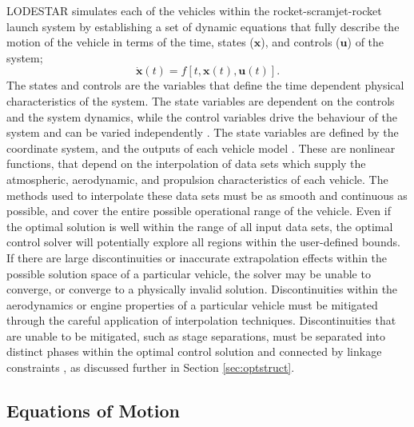 LODESTAR simulates each of the vehicles within the rocket-scramjet-rocket launch system by establishing a set of dynamic equations that fully describe the motion of the vehicle in terms of the time, states ($\mathbf{x}$), and controls ($\mathbf{u}$) of the system;
\begin{equation}\label{eq:states}
\dot{\textbf{x}}(t) = f[t,\textbf{x}(t),\textbf{u}(t)].
\end{equation}
 The states and controls are the variables that define the time dependent physical characteristics of the system. The state variables are dependent on the controls and the system dynamics, while the control variables drive the behaviour of the system and can be varied independently \cite{Stryk1992}.  
The state variables are defined by the coordinate system, and the outputs of each vehicle model \cite{Rao2009}. These are nonlinear functions, that depend on the interpolation of data sets which supply the atmospheric, aerodynamic, and propulsion characteristics of each vehicle. 
The methods used to interpolate these data sets must be as smooth and continuous as possible, and cover the entire possible operational range of the vehicle. 
Even if the optimal solution is well within the range of all input data sets, the optimal control solver will potentially explore all regions within the user-defined bounds. 
If there are large discontinuities or inaccurate extrapolation effects within the possible solution space of a particular vehicle, the solver may be unable to converge, or converge to a physically invalid solution. 
Discontinuities within the aerodynamics or engine properties of a particular vehicle must be mitigated through the careful application of interpolation techniques. Discontinuities that are unable to be mitigated, such as stage separations, must be separated into distinct phases within the optimal control solution and connected by linkage constraints \cite{Betts1998}, as discussed further in Section \ref{sec:optstruct}. 

\subsection{Equations of Motion}


